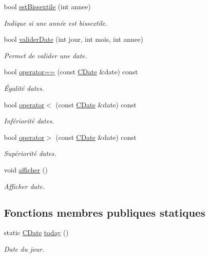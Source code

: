 \begin{DoxyCompactItemize}
bool \hyperlink{class_c_date_a02dad71347f444a5ee5a889f62fb5f4e}{estBissextile} (int annee)
\begin{DoxyCompactList}\small\item\em Indique si une année est bissextile. \item\end{DoxyCompactList}\item 
bool \hyperlink{class_c_date_a45a71c91bd790e7b84405c8128e4094b}{validerDate} (int jour, int mois, int annee)
\begin{DoxyCompactList}\small\item\em Permet de valider une date. \item\end{DoxyCompactList}\item 
bool \hyperlink{class_c_date_a82e5b049e86145b62893f194b5638ad6}{operator==} (const \hyperlink{class_c_date}{CDate} \&date) const 
\begin{DoxyCompactList}\small\item\em Égalité dates. \item\end{DoxyCompactList}\item 
bool \hyperlink{class_c_date_a2764c65e43a4ee956cd16f8ce242dbc7}{operator$<$} (const \hyperlink{class_c_date}{CDate} \&date) const 
\begin{DoxyCompactList}\small\item\em Infériorité dates. \item\end{DoxyCompactList}\item 
bool \hyperlink{class_c_date_ac653ba135b3681a64448872b2d6a0c17}{operator$>$} (const \hyperlink{class_c_date}{CDate} \&date) const 
\begin{DoxyCompactList}\small\item\em Supériorité dates. \item\end{DoxyCompactList}\item 
void \hyperlink{class_c_date_a9b58a7c96cf53352328906e30891e4e4}{afficher} ()
\begin{DoxyCompactList}\small\item\em Afficher date. \item\end{DoxyCompactList}\end{DoxyCompactItemize}
\subsection*{Fonctions membres publiques statiques}
\begin{DoxyCompactItemize}
\item 
static \hyperlink{class_c_date}{CDate} \hyperlink{class_c_date_a5367206ed910298afbf1bf57efe47c92}{today} ()
\begin{DoxyCompactList}\small\item\em Date du jour. \item\end{DoxyCompactList}\end{DoxyCompactItemize}


